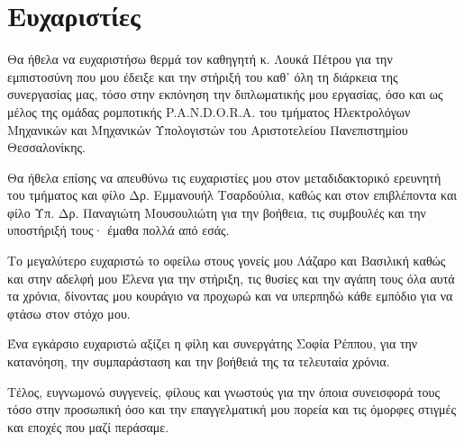 \section*{Ευχαριστίες}
{}


Θα ήθελα να ευχαριστήσω θερμά τον καθηγητή κ. Λουκά Πέτρου
για την εμπιστοσύνη που μου έδειξε και την στήριξή του καθ᾽ όλη τη
διάρκεια της συνεργασίας μας, τόσο στην εκπόνηση την διπλωματικής
μου εργασίας, όσο και ως μέλος της ομάδας ρομποτικής P.A.N.D.O.R.A. του
τμήματος Ηλεκτρολόγων Μηχανικών και Μηχανικών Υπολογιστών
του Αριστοτελείου Πανεπιστημίου Θεσσαλονίκης.

Θα ήθελα επίσης να απευθύνω τις ευχαριστίες μου στον μεταδιδακτορικό
ερευνητή του τμήματος και φίλο Δρ. Εμμανουήλ Τσαρδούλια, καθώς και στον επιβλέποντα
και φίλο Υπ. Δρ. Παναγιώτη Μουσουλιώτη για την βοήθεια, τις συμβουλές και
την υποστήριξή τους· έμαθα πολλά από εσάς.

Το μεγαλύτερο ευχαριστώ το οφείλω στους γονείς μου Λάζαρο και Βασιλική καθώς
και στην αδελφή μου Έλενα για την στήριξη, τις θυσίες και την αγάπη τους όλα αυτά
τα χρόνια, δίνοντας μου κουράγιο να προχωρώ και να υπερπηδώ κάθε εμπόδιο
για να φτάσω στον στόχο μου.

Ένα εγκάρσιο ευχαριστώ αξίζει η φίλη και συνεργάτης Σοφία Ρέππου,
για την κατανόηση, την συμπαράσταση και την βοήθειά της τα τελευταία
χρόνια.

Τέλος, ευγνωμονώ συγγενείς, φίλους και γνωστούς για την όποια
συνεισφορά τους τόσο στην προσωπική όσο και την επαγγελματική μου πορεία
και τις όμορφες στιγμές και εποχές που μαζί περάσαμε.
